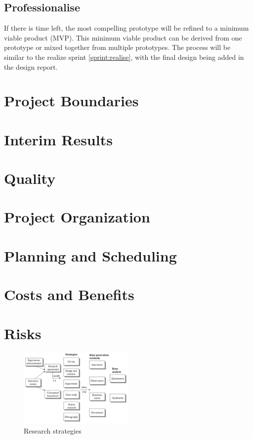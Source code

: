 \documentclass[11pt, a4paper]{article}
\begin{document}
\subsection{Professionalise}
If there is time left, the most compelling prototype will be refined to a minimum viable product (MVP). This minimum viable product can be derived from one prototype or mixed together from multiple prototypes. The process will be similar to the realize sprint \ref{sprint:realise}, with the final design being added in the design report.

\section{Project Boundaries} \label{projectboundaries}

\section{Interim Results}

\section{Quality}

\section{Project Organization}

\section{Planning and Scheduling}

\section{Costs and Benefits}

\section{Risks}

\begin{figure}[h]
    \center
    \includegraphics[width=0.5\textwidth]{research-strategies.png}
    \caption{Research strategies \cite{oates2005researching}}
    \label{fig:research_strategies}
\end{figure}

\printbibliography 
\pagebreak

\end{document}
